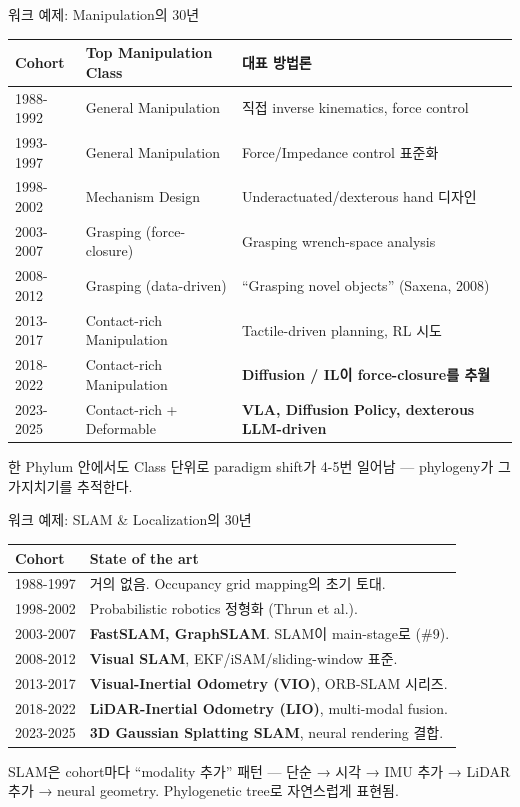 \documentclass[aspectratio=169,t]{beamer}
\newcommand{\hot}[1]{\textcolor{accentorange}{\textbf{#1}}}
\newcommand{\cool}[1]{\textcolor{accentblue}{\textbf{#1}}}
\newcommand{\muted}[1]{\textcolor{mutedgray}{#1}}
\begin{document}
\begin{frame}{워크 예제: Manipulation의 30년}
\small
\begin{tabular}{@{}lll@{}}
\toprule
\textbf{Cohort} & \textbf{Top Manipulation Class} & \textbf{대표 방법론} \\
\midrule
1988-1992 & General Manipulation       & 직접 inverse kinematics, force control \\
1993-1997 & General Manipulation       & Force/Impedance control 표준화 \\
1998-2002 & Mechanism Design           & Underactuated/dexterous hand 디자인 \\
2003-2007 & Grasping (force-closure)   & Grasping wrench-space analysis \\
2008-2012 & Grasping (data-driven)     & ``Grasping novel objects'' (Saxena, 2008) \\
2013-2017 & Contact-rich Manipulation  & Tactile-driven planning, RL 시도 \\
2018-2022 & Contact-rich Manipulation  & \cool{Diffusion / IL이 force-closure를 추월} \\
2023-2025 & Contact-rich + Deformable  & \hot{VLA, Diffusion Policy, dexterous LLM-driven} \\
\bottomrule
\end{tabular}
\vfill
\muted{한 Phylum 안에서도 Class 단위로 paradigm shift가 4-5번 일어남 — phylogeny가 그 가지치기를 추적한다.}
\end{frame}

\begin{frame}{워크 예제: SLAM \& Localization의 30년}
\small
\begin{tabular}{@{}ll@{}}
\toprule
\textbf{Cohort} & \textbf{State of the art} \\
\midrule
1988-1997 & 거의 없음. Occupancy grid mapping의 초기 토대. \\
1998-2002 & Probabilistic robotics 정형화 (Thrun et al.). \\
2003-2007 & \cool{FastSLAM, GraphSLAM}. SLAM이 main-stage로 (\#9). \\
2008-2012 & \cool{Visual SLAM}, EKF/iSAM/sliding-window 표준. \\
2013-2017 & \cool{Visual-Inertial Odometry (VIO)}, ORB-SLAM 시리즈. \\
2018-2022 & \cool{LiDAR-Inertial Odometry (LIO)}, multi-modal fusion. \\
2023-2025 & \hot{3D Gaussian Splatting SLAM}, neural rendering 결합. \\
\bottomrule
\end{tabular}
\vfill
\muted{SLAM은 cohort마다 ``modality 추가'' 패턴 — 단순 → 시각 → IMU 추가 → LiDAR 추가 → neural geometry. Phylogenetic tree로 자연스럽게 표현됨.}
\end{frame}
\end{document}
